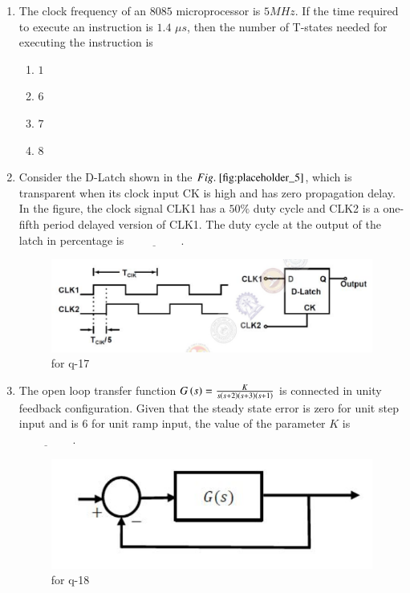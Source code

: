 \documentclass[journal,12pt,onecolumn]{IEEEtran}
\theoremstyle{remark}
\begin{document}
\begin{enumerate}
\item The clock frequency of an $8085$ microprocessor is $5 MHz$. If the time required to execute an instruction is $1.4$ $\mu s$, then the number of T-states needed for executing the instruction is

\begin{multicols}{4}
\begin{enumerate}
\item $1$
\item $6$
\item $7$
\item $8$
\end{enumerate}
\end{multicols}
\hfill {}

\item Consider the D-Latch shown in the $\figref{fig:placeholder_5}$, which is transparent when its clock input CK is high and has zero propagation delay. In the figure, the clock signal CLK1 has a $50\%$ duty cycle and CLK2 is a one-fifth period delayed version of CLK1. The duty cycle at the output of the latch in percentage is $\underline{\hspace{2cm}}$.
\begin{figure}[H]
    \centering
    \includegraphics[width=0.5\columnwidth]{figs/5.png}
    \caption{\centering for q-17}
    \label{fig:placeholder_5}
\end{figure}

\hfill {}

\item The open loop transfer function $G\left(s\right) = \frac{K}{s\left(s+2\right)\left(s+3\right)\left(s+1\right)}$ is connected in unity feedback configuration. Given that the steady state error is zero for unit step input and is $6$ for unit ramp input, the value of the parameter $K$ is $\underline{\hspace{2cm}}$.
\begin{figure}[H]
    \centering
    \includegraphics[width=0.5\columnwidth]{figs/6.png}
    \caption{\centering for q-18}
    \label{fig:placeholder_6}
\end{figure}


\end{enumerate}
\end{document}
